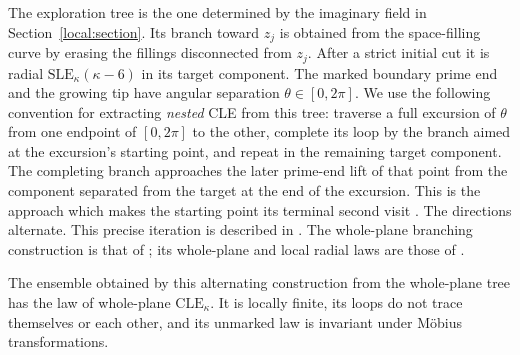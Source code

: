 The exploration tree is the one determined by the imaginary field in
Section~\ref{local:section}.  Its branch toward $z_j$ is obtained from the
space-filling curve by erasing the fillings disconnected from $z_j$.
After a strict initial cut it is radial
$\mathrm{SLE}_{\kappa}(\kappa-6)$ in its target component.  The marked
boundary prime end and the growing tip have angular separation
$\theta\in[0,2\pi]$.  We use the following convention for extracting
\emph{nested} CLE from this tree: traverse a full excursion of $\theta$
from one endpoint of $[0,2\pi]$ to the other, complete its loop by the
branch aimed at the excursion's starting point, and repeat in the
remaining target component.  The completing branch approaches the
later prime-end lift of that point from the component separated from
the target at the end of the excursion.  This is the approach which
makes the starting point its terminal second visit
\cite[Section~2.1.6 and Figure~4]{AruHoldenPowellSunCritical}.
The directions alternate.  This precise
iteration is described in
\cite[Remark~2.3 and Sections~2.1.6--2.1.7]{AruHoldenPowellSunCritical}.
The whole-plane branching construction is that of
\cite[Section~2.3.1]{GwynneMillerQianCLE}; its whole-plane and local
radial laws are those of \cite[Section~2.1.3]{MillerSheffieldIGIV}.

\begin{lemma}
\label{loop:ensemble-law}
The ensemble obtained by this alternating construction from the
whole-plane tree has the law of whole-plane $\mathrm{CLE}_{\kappa}$.
It is locally finite, its loops do not trace themselves or each other,
and its unmarked law is invariant under M\"obius transformations.
\end{lemma}

